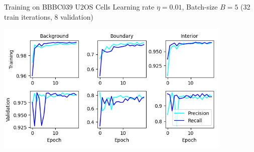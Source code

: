 \documentclass[aspectratio=1610]{beamer}					%
\begin{document}
\begin{frame}{Training on BBBC039 U2OS Cells}
Learning rate $\eta=0.01$, Batch-size $B=5$ (32 train iterations, 8 validation)
\begin{center}
\includegraphics[width=0.85\textwidth]{metrics.png}
\end{center}

\end{frame}
\end{document}
